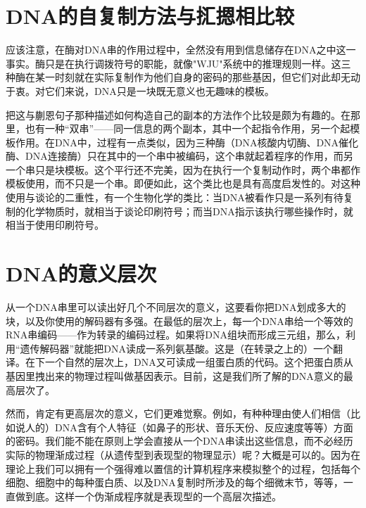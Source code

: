 \section{DNA的自复制方法与㧟摁相比较}

应该注意，在酶对DNA串的作用过程中，全然没有用到信息储存在DNA之中这一事实。酶只是在执行调拨符号的职能，就像"WJU"系统中的推理规则一样。这三种酶在某一时刻就在实际复制作为他们自身的密码的那些基因，但它们对此却无动于衷。对它们来说，DNA只是一块既无意义也无趣味的模板。

把这与蒯恩句子那种描述如何构造自己的副本的方法作个比较是颇为有趣的。在那里，也有一种“双串”——同一信息的两个副本，其中一个起指令作用，另一个起模板作用。在DNA中，过程有一点类似，因为三种酶（DNA核酸内切酶、DNA催化酶、DNA连接酶）只在其中的一个串中被编码，这个串就起着程序的作用，而另一个串只是块模板。这个平行还不完美，因为在执行一个复制动作时，两个串都作模板使用，而不只是一个串。即便如此，这个类比也是具有高度启发性的。对这种使用与谈论的二重性，有一个生物化学的类比：当DNA被看作只是一系列有待复制的化学物质时，就相当于谈论印刷符号；而当DNA指示该执行哪些操作时，就相当于使用印刷符号。

\section{DNA的意义层次}

从一个DNA串里可以读出好几个不同层次的意义，这要看你把DNA划成多大的块，以及你使用的解码器有多强。在最低的层次上，每一个DNA串给一个等效的RNA串编码——作为转录的编码过程。如果将DNA组块而形成三元组，那么，利用“遗传解码器”就能把DNA读成一系列氨基酸。这是（在转录之上的）一个翻译。在下一个自然的层次上，DNA又可读成一组蛋白质的代码。这个把蛋白质从基因里拽出来的物理过程叫做基因表示。目前，这是我们所了解的DNA意义的最高层次了。

然而，肯定有更高层次的意义，它们更难觉察。例如，有种种理由使人们相信（比如说人的）DNA含有个人特征（如鼻子的形状、音乐天份、反应速度等等）方面的密码。我们能不能在原则上学会直接从一个DNA串读出这些信息，而不必经历实际的物理渐成过程（从遗传型到表现型的物理显示）呢？大概是可以的。因为在理论上我们可以拥有一个强得难以置信的计算机程序来模拟整个的过程，包括每个细胞、细胞中的每种蛋白质、以及DNA复制时所涉及的每个细微末节，等等，一直做到底。这样一个伪渐成程序就是表现型的一个高层次描述。

